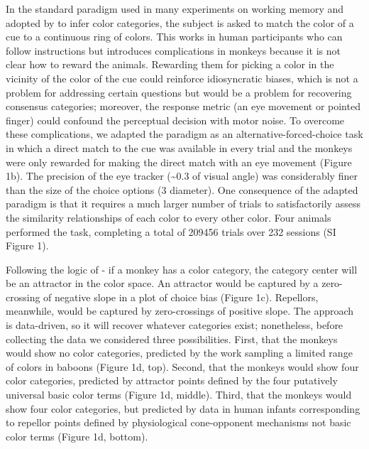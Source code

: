 \documentclass[9pt,biorxiv,lineno,onehalfspacing]{lapreprint}
\begin{document}
\begin{refsection}
In the standard paradigm used in many experiments on working memory \citep{wilken_detection_2004,zhang_discrete_2008,panichello_error-correcting_2019,schurgin_psychophysical_2020} and adopted by \citet{bae_why_2015} to infer color categories, the subject is asked to match the color of a cue to a continuous ring of colors. 
This works in human participants who can follow instructions but introduces complications in monkeys because it is not clear how to reward the animals. 
Rewarding them for picking a color in the vicinity of the color of the cue could reinforce idiosyncratic biases, which is not a problem for addressing certain questions \citep{panichello_error-correcting_2019} but would be a problem for recovering consensus categories; moreover, the response metric (an eye movement or pointed finger) could confound the perceptual decision with motor noise. 
To overcome these complications, we adapted the paradigm as an alternative-forced-choice task in which a direct match to the cue was available in every trial and the monkeys were only rewarded for making the direct match with an eye movement (Figure 1b). 
The precision of the eye tracker (\textasciitilde0.3\degree{} of visual angle) was considerably finer than the size of the choice options (3\degree{} diameter). 
One consequence of the adapted paradigm is that it requires a much larger number of trials to satisfactorily assess the similarity relationships of each color to every other color. 
Four animals performed the task, completing a total of 209456 trials over 232 sessions (SI Figure 1).

Following the logic of \citet{bae_why_2015} - if a monkey has a color category, the category center will be an attractor in the color space. 
An attractor would be captured by a zero-crossing of negative slope in a plot of choice bias (Figure 1c). 
Repellors, meanwhile, would be captured by zero-crossings of positive slope. 
The approach is data-driven, so it will recover whatever categories exist; nonetheless, before collecting the data we considered three possibilities. 
First, that the monkeys would show no color categories, predicted by the work sampling a limited range of colors in baboons \citep{davidoff_cross-species_2010} (Figure 1d, top). 
Second, that the monkeys would show four color categories, predicted by attractor points defined by the four putatively universal basic color terms (Figure 1d, middle). 
Third, that the monkeys would show four color categories, but predicted by data in human infants corresponding to repellor points defined by physiological cone-opponent mechanisms not basic color terms \citep{skelton_biological_2017} (Figure 1d, bottom).


\end{refsection}
\end{document}
